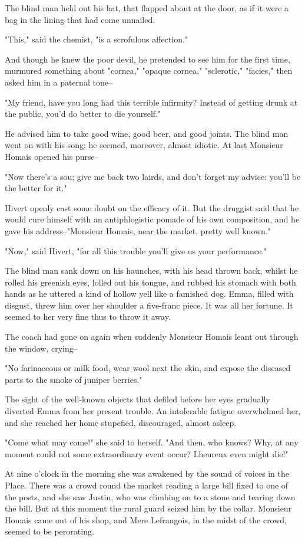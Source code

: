 \documentclass{tufte-book}
\begin{document}
The blind man held out his hat, that flapped about at the door, as if it
were a bag in the lining that had come unnailed.

"This," said the chemist, "is a scrofulous affection."

And though he knew the poor devil, he pretended to see him for the first
time, murmured something about "cornea," "opaque cornea," "sclerotic,"
"facies," then asked him in a paternal tone--

"My friend, have you long had this terrible infirmity? Instead of
getting drunk at the public, you'd do better to die yourself."

He advised him to take good wine, good beer, and good joints. The blind
man went on with his song; he seemed, moreover, almost idiotic. At last
Monsieur Homais opened his purse--

"Now there's a sou; give me back two lairds, and don't forget my advice:
you'll be the better for it."

Hivert openly cast some doubt on the efficacy of it. But the druggist
said that he would cure himself with an antiphlogistic pomade of his own
composition, and he gave his address--"Monsieur Homais, near the market,
pretty well known."

"Now," said Hivert, "for all this trouble you'll give us your
performance."

The blind man sank down on his haunches, with his head thrown back,
whilst he rolled his greenish eyes, lolled out his tongue, and rubbed
his stomach with both hands as he uttered a kind of hollow yell like a
famished dog. Emma, filled with disgust, threw him over her shoulder
a five-franc piece. It was all her fortune. It seemed to her very fine
thus to throw it away.

The coach had gone on again when suddenly Monsieur Homais leant out
through the window, crying--

"No farinaceous or milk food, wear wool next the skin, and expose the
diseased parts to the smoke of juniper berries."

The sight of the well-known objects that defiled before her eyes
gradually diverted Emma from her present trouble. An intolerable fatigue
overwhelmed her, and she reached her home stupefied, discouraged, almost
asleep.

"Come what may come!" she said to herself. "And then, who knows? Why, at
any moment could not some extraordinary event occur? Lheureux even might
die!"

At nine o'clock in the morning she was awakened by the sound of voices
in the Place. There was a crowd round the market reading a large bill
fixed to one of the posts, and she saw Justin, who was climbing on to
a stone and tearing down the bill. But at this moment the rural guard
seized him by the collar. Monsieur Homais came out of his shop, and Mere
Lefrangois, in the midst of the crowd, seemed to be perorating.
\end{document}
